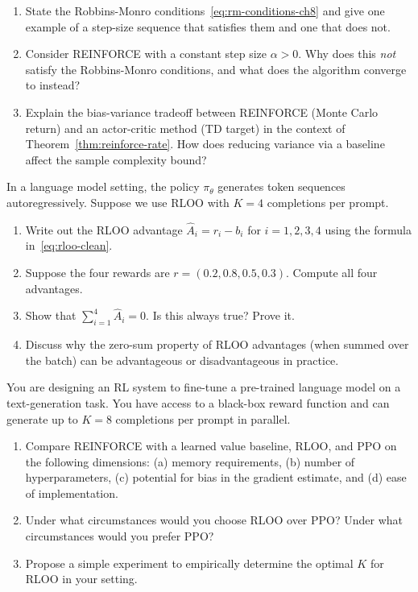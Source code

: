 \begin{exercise}
\label{ex:pg-convergence}
\begin{enumerate}
\item State the Robbins-Monro conditions~\eqref{eq:rm-conditions-ch8} and give one example of a step-size sequence that satisfies them and one that does not.
\item Consider REINFORCE with a constant step size $\alpha > 0$.  Why does this \emph{not} satisfy the Robbins-Monro conditions, and what does the algorithm converge to instead?
\item Explain the bias-variance tradeoff between REINFORCE (Monte Carlo return) and an actor-critic method (TD target) in the context of Theorem~\ref{thm:reinforce-rate}.  How does reducing variance via a baseline affect the sample complexity bound?
\end{enumerate}
\end{exercise}

\begin{exercise}
\label{ex:pg-lm}
In a language model setting, the policy $\pi_\theta$ generates token sequences autoregressively.  Suppose we use RLOO with $K = 4$ completions per prompt.
\begin{enumerate}
\item Write out the RLOO advantage $\hat A_i = r_i - b_i$ for $i = 1, 2, 3, 4$ using the formula in~\eqref{eq:rloo-clean}.
\item Suppose the four rewards are $r = (0.2, 0.8, 0.5, 0.3)$.  Compute all four advantages.
\item Show that $\sum_{i=1}^4 \hat A_i = 0$.  Is this always true?  Prove it.
\item Discuss why the zero-sum property of RLOO advantages (when summed over the batch) can be advantageous or disadvantageous in practice.
\end{enumerate}
\end{exercise}

\begin{exercise}
\label{ex:pg-comparison-design}
You are designing an RL system to fine-tune a pre-trained language model on a text-generation task.  You have access to a black-box reward function and can generate up to $K = 8$ completions per prompt in parallel.
\begin{enumerate}
\item Compare REINFORCE with a learned value baseline, RLOO, and PPO on the following dimensions: (a) memory requirements, (b) number of hyperparameters, (c) potential for bias in the gradient estimate, and (d) ease of implementation.
\item Under what circumstances would you choose RLOO over PPO?  Under what circumstances would you prefer PPO?
\item Propose a simple experiment to empirically determine the optimal $K$ for RLOO in your setting.
\end{enumerate}
\end{exercise}
